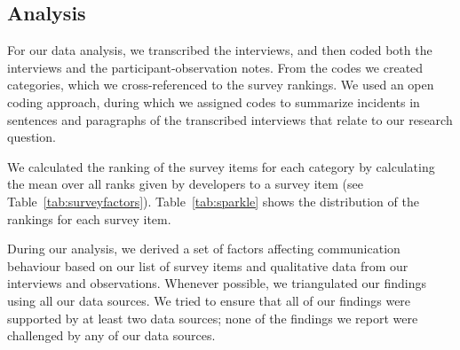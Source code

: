 





%

\subsection{Analysis} 
For our data analysis, we transcribed the interviews, and then coded both the interviews and the participant-observation notes. From the codes we created categories, which we cross-referenced to the survey rankings. We used an open coding approach, during which we assigned codes to summarize incidents in sentences and paragraphs of the transcribed interviews that relate to our research question.


We calculated the ranking of the survey items for each category by calculating the mean over all ranks given by developers to a survey item (see Table~\ref{tab:surveyfactors}).
Table~\ref{tab:sparkle} shows the distribution of the rankings for each survey item.

During our analysis, we derived a set of factors affecting communication behaviour based on our list of survey items and qualitative data from our interviews and observations. Whenever possible, we triangulated our findings using all our data sources. We tried to ensure that all of our findings were supported by at least two data sources; none of the findings we report were challenged by any of our data sources. 


